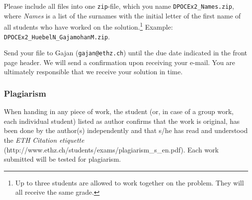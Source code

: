 \documentclass[uebung]{ETHIDSCprogramming_dpoc}
\begin{document}
Please include all files into one {\tt zip}-file, which you name {\tt DPOCEx2\_Names.zip}, where {\it Names} 
is a list of the surnames with the initial letter of the first name of all students who have worked
on the solution.\footnote{Up to three students are allowed to work together on the problem.  They will all receive the same grade.} 
Example:  {\tt DPOCEx2\_HuebelN\_GajamohanM.zip}.

Send your file to Gajan ({\tt gajan@ethz.ch}) until the due date indicated in the front page header.  We will send a confirmation upon receiving your e-mail.  You are ultimately responsible that we receive your solution in time.


\subsubsection*{Plagiarism}
When handing in any piece of work, the student (or, in case of a group work, each individual student) listed as author confirms that the work is original, has been done by the author(s) independently and that s/he has read and understood the \textit{ETH Citation etiquette} (http://www.ethz.ch/students/exams/plagiarism\_s\_en.pdf). Each work submitted will be tested for plagiarism.
\end{document}
